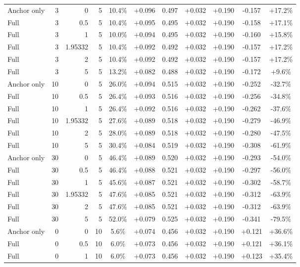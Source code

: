 \begin{table}[htbp]
\begin{tabular}{lrrrccccccc}
Anchor only & 3 & 0 & 5 & 10.4\% & +0.096 & 0.497 & +0.032 & +0.190 & -0.157 & +17.2\% \\
Full & 3 & 0.5 & 5 & 10.4\% & +0.095 & 0.495 & +0.032 & +0.190 & -0.158 & +17.1\% \\
Full & 3 & 1 & 5 & 10.0\% & +0.094 & 0.495 & +0.032 & +0.190 & -0.160 & +15.8\% \\
Full & 3 & 1.95332 & 5 & 10.4\% & +0.092 & 0.492 & +0.032 & +0.190 & -0.157 & +17.2\% \\
Full & 3 & 2 & 5 & 10.4\% & +0.092 & 0.492 & +0.032 & +0.190 & -0.157 & +17.2\% \\
Full & 3 & 5 & 5 & 13.2\% & +0.082 & 0.488 & +0.032 & +0.190 & -0.172 & +9.6\% \\
Anchor only & 10 & 0 & 5 & 26.0\% & +0.094 & 0.515 & +0.032 & +0.190 & -0.252 & -32.7\% \\
Full & 10 & 0.5 & 5 & 26.4\% & +0.093 & 0.516 & +0.032 & +0.190 & -0.256 & -34.8\% \\
Full & 10 & 1 & 5 & 26.4\% & +0.092 & 0.516 & +0.032 & +0.190 & -0.262 & -37.6\% \\
Full & 10 & 1.95332 & 5 & 27.6\% & +0.089 & 0.518 & +0.032 & +0.190 & -0.279 & -46.9\% \\
Full & 10 & 2 & 5 & 28.0\% & +0.089 & 0.518 & +0.032 & +0.190 & -0.280 & -47.5\% \\
Full & 10 & 5 & 5 & 30.4\% & +0.084 & 0.519 & +0.032 & +0.190 & -0.308 & -61.9\% \\
Anchor only & 30 & 0 & 5 & 46.4\% & +0.089 & 0.520 & +0.032 & +0.190 & -0.293 & -54.0\% \\
Full & 30 & 0.5 & 5 & 46.4\% & +0.088 & 0.521 & +0.032 & +0.190 & -0.297 & -56.0\% \\
Full & 30 & 1 & 5 & 45.6\% & +0.087 & 0.521 & +0.032 & +0.190 & -0.302 & -58.7\% \\
Full & 30 & 1.95332 & 5 & 47.6\% & +0.085 & 0.521 & +0.032 & +0.190 & -0.312 & -63.9\% \\
Full & 30 & 2 & 5 & 47.6\% & +0.085 & 0.521 & +0.032 & +0.190 & -0.312 & -63.9\% \\
Full & 30 & 5 & 5 & 52.0\% & +0.079 & 0.525 & +0.032 & +0.190 & -0.341 & -79.5\% \\
Anchor only & 0 & 0 & 10 & 5.6\% & +0.074 & 0.456 & +0.032 & +0.190 & +0.121 & +36.6\% \\
Full & 0 & 0.5 & 10 & 6.0\% & +0.073 & 0.456 & +0.032 & +0.190 & +0.121 & +36.1\% \\
Full & 0 & 1 & 10 & 6.0\% & +0.073 & 0.456 & +0.032 & +0.190 & +0.123 & +35.4\% \\

\end{tabular}
\end{table}

